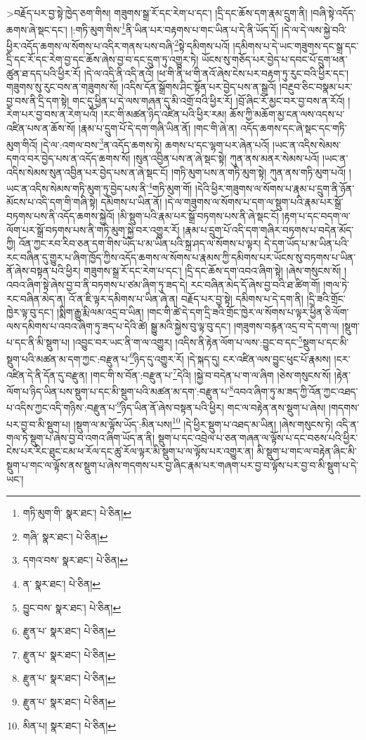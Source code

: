 >བརྗོད་པར་བྱ་སྟེ་ཁྱེད་ཅག་གིས། གཟུགས་སྒྲ་རོ་དང་རེག་པ་དང་། །དྲི་དང་ཆོས་དག་རྣམ་དྲུག་ནི། །བཞི་སྟེ་འདོད་ཆགས་ཞེ་སྡང་དང་། །:གཏི་མུག་གིས་\footnote{གཏི་མུག་གི་  སྣར་ཐང་།  པེ་ཅིན། }ནི་ཡིན་པར་བརྟགས་པ་གང་ཡིན་པ་དེ་ནི་ཡོད་དོ། །དེ་ལ་དེ་ལས་སྐྱེ་བའི་ཕྱིར་འདོད་ཆགས་ལ་སོགས་པ་འདིར་གནས་པས་བཞི་\footnote{གཞི་  སྣར་ཐང་།  པེ་ཅིན། }སྟེ་དམིགས་པའོ། །དམིགས་པ་དེ་ཡང་གཟུགས་དང་སྒྲ་དང་དྲི་དང་རོ་དང་རེག་བྱ་དང་ཆོས་ཞེས་བྱ་བ་དང་དྲུག་ཏུ་འགྱུར་ཏེ། ཡོངས་སུ་གཅོད་པར་བྱེད་པ་དབང་པོ་དྲུག་ཕན་ཚུན་ཐ་དད་པའི་ཕྱིར་རོ། །དེ་ལ་འདི་ནི་འདི་ནའོ། །ཕ་གི་ནི་ཕ་གི་ནའོ་ཞེས་ངེས་པར་བརྟག་ཏུ་རུང་བའི་ཕྱིར་དང་། གཟུགས་སུ་རུང་བས་ན་གཟུགས་སོ། །འདིས་དོན་སྒྲོགས་ཤིང་སྟོན་པར་བྱེད་པས་ན་སྒྲའོ། །བརྔུབ་ཅིང་བསྣམ་པར་བྱ་བས་ནི་དྲི་དག་སྟེ། གང་དུ་ཕྱིན་པ་དེ་ལས་གཞན་དུ་མི་འགྲོ་བའི་ཕྱིར་རོ། །བྲོ་ཞིང་རོ་མྱང་བར་བྱ་བས་ན་རོའོ། །རེག་པར་བྱ་བས་ན་རེག་པའོ། །རང་གི་མཚན་ཉིད་འཛིན་པའི་ཕྱིར་རམ། ཆོས་ཀྱི་མཆོག་མྱ་ངན་ལས་འདས་པ་འཛིན་པས་ན་ཆོས་སོ། །རྣམ་པ་དྲུག་པོ་དེ་དག་གཞི་ཡིན་ནོ། །གང་གི་ཞེ་ན། འདོད་ཆགས་དང་ཞེ་སྡང་དང་གཏི་མུག་གིའོ། །དེ་ལ་:འགལ་བས་\footnote{དགའ་བས་  སྣར་ཐང་།  པེ་ཅིན། }ན་འདོད་ཆགས་ཏེ། ཆགས་པ་དང་ལྷག་པར་ཞེན་པའོ། །ཡང་ན་འདིས་སེམས་དགའ་བར་བྱེད་པས་ན་འདོད་ཆགས་སོ། །སུན་འབྱིན་པས་ན་ཞེ་སྡང་སྟེ། ཀུན་ནས་མནར་སེམས་པའོ། །ཡང་ན་འདིས་སེམས་སུན་འབྱིན་པར་བྱེད་པས་ན་ཞེ་སྡང་ངོ། །གཏི་མུག་པས་ན་གཏི་མུག་སྟེ། ཀུན་ནས་གཏི་མུག་པའོ། །ཡང་ན་འདིས་སེམས་གཏི་མུག་ཏུ་བྱེད་པས་ནི་\footnote{ན་  སྣར་ཐང་།  པེ་ཅིན། }གཏི་མུག་གོ། །དེའི་ཕྱིར་གཟུགས་ལ་སོགས་པ་རྣམ་པ་དྲུག་ནི་ཉོན་མོངས་པ་འདི་དག་གི་གཞི་སྟེ། དམིགས་པ་ཡིན་ནོ། །དེ་ལ་གཟུགས་ལ་སོགས་པ་དག་ལ་སྡུག་པའི་རྣམ་པར་སྒྲོ་བཏགས་པས་ནི་འདོད་ཆགས་སྐྱེའོ། །མི་སྡུག་པའི་རྣམ་པར་སྒྲོ་བཏགས་པས་ནི་ཞེ་སྡང་ངོ། །རྟག་པ་དང་བདག་ལ་ལོག་པར་སྒྲོ་བཏགས་པས་ནི་གཏི་མུག་སྐྱེ་བར་འགྱུར་རོ། །རྣམ་པ་དྲུག་པོ་འདི་དག་གཞིར་བཏགས་པ་བདེན་མོད་ཀྱི། འོན་ཀྱང་རབ་རིབ་ཅན་དག་གིས་ཡོད་པ་མ་ཡིན་པའི་སྐྲ་ཤད་ལ་སོགས་པ་ལྟར། དེ་དག་ཡོད་པ་མ་ཡིན་པའི་རང་བཞིན་དུ་གྱུར་པ་ཞིག་ཁྱོད་ཀྱིས་འདོད་ཆགས་ལ་སོགས་པ་རྣམས་ཀྱི་དམིགས་པར་ཡོངས་སུ་བཏགས་པ་ཡིན་ནོ་ཞེས་བསྟན་པའི་ཕྱིར། གཟུགས་སྒྲ་རོ་དང་རེག་པ་དང་། །དྲི་དང་ཆོས་དག་འབའ་ཞིག་སྟེ། །ཞེས་གསུངས་སོ། །འབའ་ཞིག་སྟེ་ཞེས་བྱ་བ་ནི་བཏགས་པ་ཙམ་ཞིག་ཏུ་ཟད་དེ། རང་བཞིན་མེད་དོ་ཞེས་བྱ་བའི་ཐ་ཚིག་གོ། །གལ་ཏེ་རང་བཞིན་མེད་ན། འོ་ན་ཇི་ལྟར་དམིགས་པ་ཡིན་ཞེ་ན། བརྗོད་པར་བྱ་སྟེ། དམིགས་པ་དེ་དག་ནི། །དྲི་ཟའི་གྲོང་ཁྱེར་ལྟ་བུ་དང་། །སྨིག་རྒྱུ་རྨི་ལམ་འདྲ་བ་ཡིན། །གང་གི་ཚེ་དེ་དག་དྲི་ཟའི་གྲོང་ཁྱེར་ལ་སོགས་པ་ལྟར་ཕྱིན་ཅི་ལོག་ལས་དམིགས་པ་འབའ་ཞིག་ཏུ་ཟད་པ་དེའི་ཚེ། སྒྱུ་མའི་སྐྱེས་བུ་ལྟ་བུ་དང་། །གཟུགས་བརྙན་འདྲ་བ་དེ་དག་ལ། །སྡུག་པ་དང་ནི་མི་སྡུག་པ། །འབྱུང་བར་ཡང་ནི་ག་ལ་འགྱུར། །འདིས་ནི་རྟེན་ལོག་པ་ལས་:བྱུང་བ་དང་\footnote{བྱུང་བས་  སྣར་ཐང་།  པེ་ཅིན། }སྡུག་པ་དང་མི་སྡུག་པའི་མཚན་མ་དག་ཀྱང་:བརྫུན་པ་\footnote{རྫུན་པ་  སྣར་ཐང་།  པེ་ཅིན། }ཉིད་དུ་འགྱུར་རོ། །དེ་སྐད་དུ། ངར་འཛིན་ལས་བྱུང་ཕུང་པོ་རྣམས། །ངར་འཛིན་དེ་ནི་དོན་དུ་བརྫུན། །གང་གི་ས་བོན་:བརྫུན་པ་\footnote{རྫུན་པ་  སྣར་ཐང་།  པེ་ཅིན། }དེའི། །སྐྱེ་བ་བདེན་པ་ག་ལ་ཞིག །ཅེས་གསུངས་སོ། །རྟེན་ལོག་པ་ཉིད་ཡིན་པས་སྡུག་པ་དང་མི་སྡུག་པའི་མཚན་མ་དག་:བརྫུན་པ་\footnote{རྫུན་པ་  སྣར་ཐང་།  པེ་ཅིན། }འབའ་ཞིག་ཏུ་མ་ཟད་ཀྱི་འོན་ཀྱང་འཐད་པ་འདིས་ཀྱང་འདི་གཉིས་:བརྫུན་པ་\footnote{རྫུན་པ་  སྣར་ཐང་།  པེ་ཅིན། }ཉིད་ཡིན་ནོ་ཞེས་བསྟན་པའི་ཕྱིར། གང་ལ་བརྟེན་ནས་སྡུག་པ་ཞེས། །གདགས་པར་བྱ་བ་མི་སྡུག་པ། །སྡུག་ལ་མ་ལྟོས་ཡོད་:མིན་པས།\footnote{མིན་པ།  སྣར་ཐང་།  པེ་ཅིན། } །དེ་ཕྱིར་སྡུག་པ་འཐད་མ་ཡིན། །ཞེས་གསུངས་ཏེ། འདི་ན་གལ་ཏེ་སྡུག་པ་ཞེས་བྱ་བ་འགའ་ཞིག་ཡོད་ན་ནི། སྡུག་པ་དང་འབྲེལ་པ་ཅན་གཞན་ལ་ལྟོས་པ་དང་བཅས་པའི་ཕྱིར་ངེས་པར་རིང་ཐུང་ངམ་ཕ་རོལ་དང་ཚུ་རོལ་ལྟར་མི་སྡུག་པ་ལ་ལྟོས་པར་འགྱུར་ན། མི་སྡུག་པ་གང་ལ་བརྟེན་ཞིང་མི་སྡུག་པ་གང་ལ་ལྟོས་ནས་སྡུག་པ་ཞེས་གདགས་པར་བྱ་ཞིང་རྣམ་པར་གཞག་པར་བྱ་བ་ལྟོས་པར་བྱ་བ་མི་སྡུག་པ་དེ་ཡང་། 